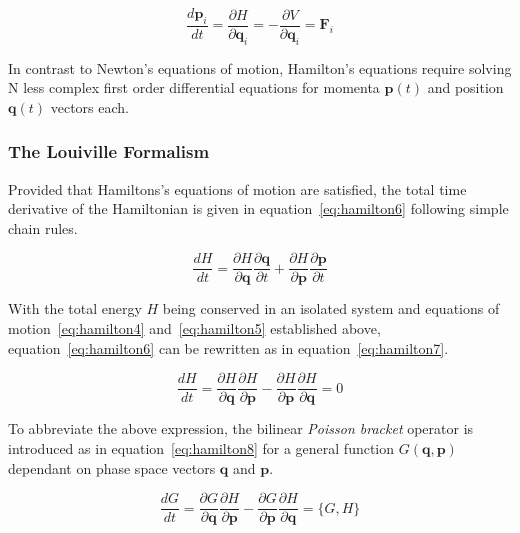 \documentclass[11pt]{article}
\begin{document}
\begin{equation}
  \frac{d\textbf{p}_i}{dt} = \frac{\partial H}{\partial \textbf{q}_i}= - \frac{\partial V}{\partial \textbf{q}_i}= \textbf{F}_i
  \label{eq:hamilton5}
\end{equation}

\bigskip

\noindent In contrast to Newton's equations of motion, Hamilton's equations require solving N less complex first order differential equations for momenta $\mathbf{p}(t)$ and position $\mathbf{q}(t)$ vectors each.

\subsubsection{The Louiville Formalism}

\noindent Provided that Hamiltons's equations of motion are satisfied, the total time derivative of the Hamiltonian is given in equation~\ref{eq:hamilton6} following simple chain rules.

\begin{equation}
  \frac{dH}{dt} = \frac{\partial H}{\partial \textbf{q}} \frac{\partial \textbf{q}}{\partial t} + \frac{\partial H}{\partial \textbf{p}} \frac{\partial \textbf{p}}{\partial t}
  \label{eq:hamilton6}
\end{equation}

\bigskip

\noindent With the total energy $H$ being conserved in an isolated system and equations of motion~\ref{eq:hamilton4} and~\ref{eq:hamilton5} established above, equation~\ref{eq:hamilton6} can be rewritten as in equation~\ref{eq:hamilton7}.

\begin{equation}
  \frac{dH}{dt} = \frac{\partial H}{\partial \textbf{q}} \frac{\partial H}{\partial \textbf{p}} - \frac{\partial H}{\partial \textbf{p}} \frac{\partial H}{\partial \textbf{q}} = 0
  \label{eq:hamilton7}
\end{equation}

\bigskip

\noindent To abbreviate the above expression, the bilinear \textit{Poisson bracket} operator is introduced as in equation~\ref{eq:hamilton8} for a general function $G(\textbf{q}, \textbf{p})$ dependant on phase space vectors $\textbf{q}$ and $\textbf{p}$.

\begin{equation}
  \frac{dG}{dt} = \frac{\partial G}{\partial \textbf{q}} \frac{\partial H}{\partial \textbf{p}} - \frac{\partial G}{\partial \textbf{p}} \frac{\partial H}{\partial \textbf{q}} = \{G, H\}
  \label{eq:hamilton8}
\end{equation}
\end{document}
